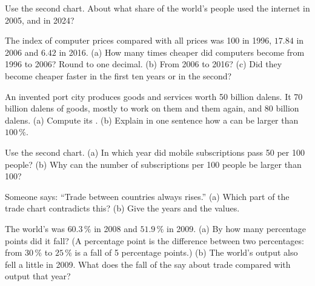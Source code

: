 \begin{exercise}[$\star$]\label{exo:g6:a-connected-world:4}
Use the second chart. About what share of the world's people used the internet in
2005, and in 2024?
\end{exercise}

\begin{exercise}[$\star\star$]\label{exo:g6:a-connected-world:5}
The index of computer prices compared with all prices was 100 in 1996, $17.84$ in
2006 and $6.42$ in 2016. (a) How many times cheaper did computers become from 1996
to 2006? Round to one decimal. (b) From 2006 to 2016? (c) Did they become cheaper
faster in the first ten years or in the second?
\end{exercise}

\begin{exercise}[$\star\star$]\label{exo:g6:a-connected-world:6}
An invented port city produces goods and services worth 50 billion dalens. It
 70 billion dalens of goods, mostly to work on them and  them again,
and  80 billion dalens. (a) Compute its . (b) Explain in one
sentence how a  can be larger than $100\,\%$.
\end{exercise}

\begin{exercise}[$\star\star$]\label{exo:g6:a-connected-world:7}
Use the second chart. (a) In which year did mobile subscriptions pass 50 per 100
people? (b) Why can the number of subscriptions per 100 people be larger than 100?
\end{exercise}

\begin{exercise}[$\star\star$]\label{exo:g6:a-connected-world:8}
Someone says: ``Trade between countries always rises.'' (a) Which part of the
trade chart contradicts this? (b) Give the years and the values.
\end{exercise}

\begin{exercise}[$\star\star$]\label{exo:g6:a-connected-world:9}
The world's  was $60.3\,\%$ in 2008 and $51.9\,\%$ in 2009. (a) By how
many percentage points did it fall? (A percentage point is the difference between
two percentages: from $30\,\%$ to $25\,\%$ is a fall of 5 percentage points.) (b) The
world's output also fell a little in 2009. What does the fall of the 
say about trade compared with output that year?
\end{exercise}

